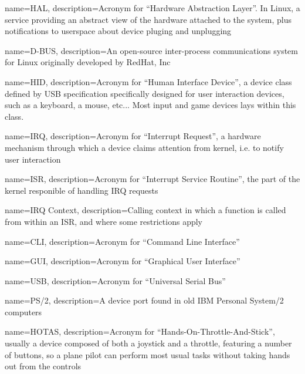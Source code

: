 {
  name=HAL,
  description={Acronym for ``Hardware Abstraction Layer''. In Linux, a service providing an abstract view of the hardware attached to the system, plus notifications to userspace about device pluging and unplugging}
}

{
  name=D-BUS,
  description={An open-source inter-process communications system for Linux originally developed by RedHat, Inc}
}

{
  name=HID,
  description={Acronym for ``Human Interface Device'', a device class defined by USB specification specifically designed for user interaction devices, such as a keyboard, a mouse, etc... Most input and game devices lays within this class.}
}

{
  name=IRQ,
  description={Acronym for ``Interrupt Request'', a hardware mechanism through which a device claims attention from kernel, i.e. to notify user interaction }
}

{
  name=ISR,
  description={Acronym for ``Interrupt Service Routine'', the part of the kernel responible of handling IRQ requests}
}

{
  name=IRQ Context,
  description={Calling context in which a function is called from within an ISR, and where some restrictions apply}
}

{
  name=CLI,
  description={Acronym for ``Command Line Interface''}
}

{
  name=GUI,
  description={Acronym for ``Graphical User Interface''}
}

{
  name=USB,
  description={Acronym for ``Universal Serial Bus''}
}

{
  name=PS/2,
  description={A device port found in old IBM Personal System/2 computers}
}

{
  name=HOTAS,
  description={Acronym for ``Hands-On-Throttle-And-Stick'', usually a device composed of both a joystick and a throttle,  featuring a number of buttons, so a plane pilot can perform most usual tasks without taking hands out from the controls}
}



\glsaddall
\printglossaries
